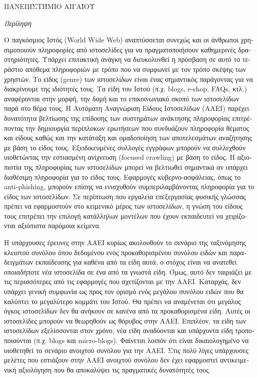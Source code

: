 \documentclass[
    12pt, %
    singlespacing, %
    liststotoc, %
    headsepline, %
]{DoctoralThesis} %
\begin{document}
\begin{abstractGR}

\begin{center}
{\normalsize \MakeUppercase{\textgreek{Πανεπιστήμιο Αιγαίου}} \par}
\bigskip
{\huge\textit{ \textgreek{Περίληψη} } \par}
\bigskip
\end{center}

\begin{greek}
Ο παγκόσμιος Ιστός (World Wide Web) αναπτύσσεται συνεχώς και οι άνθρωποι χρησιμοποιούν πληροφορίες από ιστοσελίδες για να πραγματοποιήσουν καθημερινές δραστηριότητες. Υπάρχει επιτακτική ανάγκη να διευκολυνθεί η πρόσβαση σε αυτό το τεράστιο απόθεμα πληροφοριών με τρόπο που να συμφωνεί με τον τρόπο σκέψης των χρηστών.  Το είδος (genre) των ιστοσελίδων είναι ένας σημαντικός παράγοντας για να διακρίνουμε της ιδιότητές τους. Τα είδη του Ιστού (π.χ. blogs, e-shop, FAQs, κτλ.) αναφέρονται στην μορφή, την δομή και το επικοινωνιακό σκοπό των ιστοσελίδων παρά στο θέμα τους. Η Αυτόματη Αναγνώριση Είδους Ιστοσελίδων (ΑΑΕΙ) παρέχει δυνατότητα βελτίωσης της επίδοσης των συστημάτων ανάκτησης πληροφορίας επιτρέποντας την δημιουργία περίπλοκων ερωτήσεων που συνδυάζουν πληροφορία θέματος και είδους καθώς και την κατάταξη και ομαδοποίηση των αποτελεσμάτων αναζήτησης με βάση το είδος τους. Εξειδικευμένες συλλογές εγγράφων μπορούν να συλλεχθούν υιοθετώντας την εστιασμένη ανίχνευση (focused crawling) με βάση το είδος. Η αξιοπιστία της πληροφορίας των ιστοσελίδων μπορεί να βελτιωθεί σημαντικά αν υπάρχει διαθέσιμη πληροφορία για το είδος τους. Εφαρμογές κυβερνο-ασφάλειας, όπως το anti-phishing, μπορούν επίσης να ενισχυθούν συμπεριλαμβάνοντας πληροφορία για το είδος των ιστοσελίδων. Σε περίπτωση που εργαλεία επεξεργασίας φυσικής γλώσσας πρέπει να εφαρμοστούν στο κειμενικό μέρος των ιστοσελίδων, η γνώση του είδους τους επιτρέπει την επιλογή κατάλληλων μοντέλων που έχουν εκπαιδευτεί να χειρίζονται αξιόπιστα παρόμοια κείμενα.

Η υπάρχουσες έρευνες στην ΑΑΕΙ κυρίως ακολουθούν το σενάριο της ταξινόμησης κλειστού συνόλου όπου δεδομένου ενός προκαθορισμένου συνόλου ειδών και παραδειγμάτων εκπαίδευσης για καθένα από τα είδη αυτά, ο στόχος είναι να ανατεθεί οποιαδήποτε νέα ιστοσελίδα σε ένα από τα γνωστά είδη. Όμως, αυτό δεν ταιριάζει με τις περισσότερες από τις εφαρμογές που σχετίζονται με την ΑΑΕΙ. Καταρχάς, δεν υπάρχει γενική συμφωνία ως προς τον ορισμό ενός μεγάλου συνόλου ειδών που θα καλύπτει το μεγαλύτερο κομμάτι του Ιστού. Θα πρέπει να αναμένεται ότι μεγάλος όγκος ιστοσελίδων δεν θα ανήκουν σε κανένα από τα προκαθορισμένα είδη. Αυτές οι ιστοσελίδες μπορούν να θεωρηθούν ως θόρυβος στην ΑΑΕΙ. Επιπλέον, τα είδη των ιστοσελίδων εξελίσσονται στον χρόνο, νέα είδη αναδύονται και υπάρχοντα είδη τροποποιούνται (π.χ. blogs και micro-blogs). Φαίνεται λοιπόν ότι είναι δικαιολογημένο να υιοθετηθεί το σενάριο ανοιχτού συνόλου για την ΑΑΕΙ. Στις πολύ λίγες υπάρχουσες μελέτες που εστιάζουν στην ΑΑΕΙ ανοιχτού συνόλου δεν έχει εφαρμοστεί αντικειμενική αξιολόγηση που θα αποκαλύψει τις πραγματικές δυνατότητές τους.


\end{greek}
\end{abstractGR}
\end{document}
